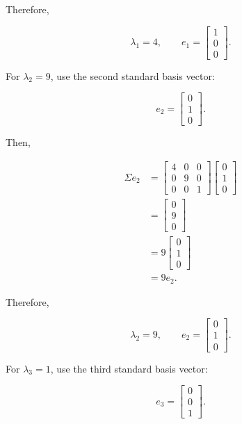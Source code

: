 \documentclass[12pt]{article}
\begin{document}
	Therefore,
	
	\[
	\boxed{
		\lambda_1=4,\qquad
		e_1=
		\begin{bmatrix}
			1\\0\\0
		\end{bmatrix}
	}.
	\]
	
	For $\lambda_2=9$, use the second standard basis vector:
	
	\[
	e_2=
	\begin{bmatrix}
		0\\1\\0
	\end{bmatrix}.
	\]
	
	Then,
	
	\[
	\begin{aligned}
		\Sigma e_2
		&=
		\begin{bmatrix}
			4&0&0\\
			0&9&0\\
			0&0&1
		\end{bmatrix}
		\begin{bmatrix}
			0\\1\\0
		\end{bmatrix}\\
		&=
		\begin{bmatrix}
			0\\9\\0
		\end{bmatrix}\\
		&=
		9
		\begin{bmatrix}
			0\\1\\0
		\end{bmatrix}\\
		&=9e_2.
	\end{aligned}
	\]
	
	Therefore,
	
	\[
	\boxed{
		\lambda_2=9,\qquad
		e_2=
		\begin{bmatrix}
			0\\1\\0
		\end{bmatrix}
	}.
	\]
	
	For $\lambda_3=1$, use the third standard basis vector:
	
	\[
	e_3=
	\begin{bmatrix}
		0\\0\\1
	\end{bmatrix}.
	\]
	
\end{document}
